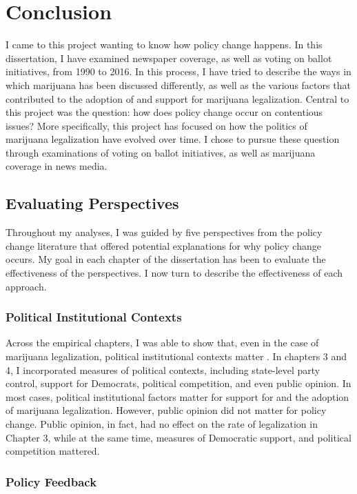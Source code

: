 \chapter{Conclusion}
 
I came to this project wanting to know how policy change happens. In this dissertation, I have examined newspaper coverage, as well as voting on ballot initiatives, from 1990 to 2016.  In this process, I have tried to describe the ways in which marijuana has been discussed differently, as well as the various factors that contributed to the adoption of and support for marijuana legalization. Central to this project was the question: how does policy change occur on contentious issues? More specifically, this project has focused on how the politics of marijuana legalization have evolved over time.  I chose to pursue these question through examinations of voting on ballot initiatives, as well as marijuana coverage in news media. 

\section{Evaluating Perspectives}

Throughout my analyses, I was guided by five perspectives from the policy change literature that offered potential explanations for why policy change occurs. My goal in each chapter of the dissertation has been to evaluate the effectiveness of the perspectives. I now turn to describe the effectiveness of each approach. 

\subsection{Political Institutional Contexts}

Across the empirical chapters, I was able to show that, even in the case of marijuana legalization, political institutional contexts matter \citep{amenta_and_elliott_2019}. In chapters 3 and 4, I incorporated measures of political contexts, including state-level party control, support for Democrats, political competition, and even public opinion. In most cases, political institutional factors matter for support for and the adoption of marijuana legalization. However, public opinion did not matter for policy change. Public opinion, in fact, had no effect on the rate of legalization in Chapter 3, while at the same time, measures of Democratic support, and political competition mattered. 

\subsection{Policy Feedback}

